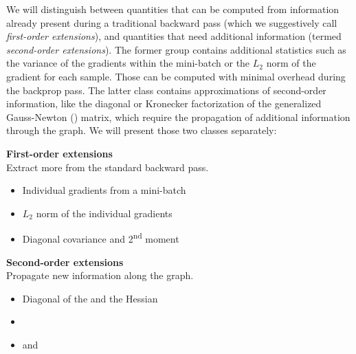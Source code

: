 We will distinguish between quantities that can be computed from information
already present during a traditional backward pass (which we suggestively call
\emph{first-order extensions}), and quantities that need additional information
(termed \emph{second-order extensions}). The former group contains additional
statistics such as the variance of the gradients within the mini-batch or the
$L_2$ norm of the gradient for each sample. Those can be computed with
minimal overhead during the backprop pass. The latter class contains
approximations of second-order information, like the diagonal or Kronecker
factorization of the generalized Gauss-Newton (\GGN) matrix, which require the
propagation of additional information through the graph. We will present those
two classes separately:

\begin{figure*}[!h]
  \centering
  \begin{minipage}[t]{0.495\linewidth}
    \begin{center}
      \textbf{First-order extensions}\\
      Extract more from the standard backward pass.~\\[-.75em]
      \begin{itemize}
      \item Individual gradients from a mini-batch
      \item $L_2$ norm of the individual gradients
      \item Diagonal covariance and 2\textsuperscript{nd} moment
      \end{itemize}
    \end{center}
  \end{minipage}
  \hfill
  \begin{minipage}[t]{0.495\linewidth}
    \begin{center}
      \textbf{Second-order extensions}\\
      Propagate new information along the graph.~\\[-.75em]
      \begin{itemize}
      \item Diagonal of the \GGN%
        and the Hessian
      \item \KFAC%
        \citep{martens2015optimizing}
      \item \KFRA%
        and \KFLR%
        \citep{botev2017practical}
      \end{itemize}
    \end{center}
  \end{minipage}
\end{figure*}

